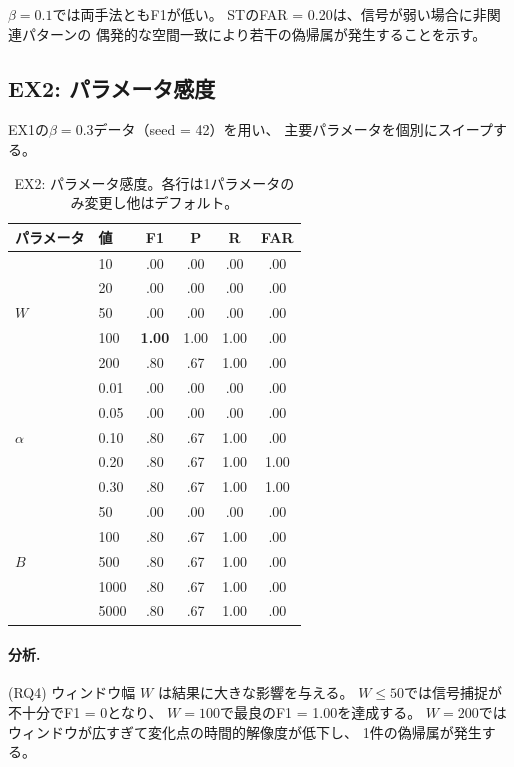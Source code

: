 $\beta = 0.1$では両手法ともF1が低い。
STのFAR = 0.20は、信号が弱い場合に非関連パターンの
偶発的な空間一致により若干の偽帰属が発生することを示す。

\subsection{EX2: パラメータ感度}\label{sec:ex2}

EX1の$\beta = 0.3$データ（seed = 42）を用い、
主要パラメータを個別にスイープする。

\begin{table}[t]
\centering
\caption{EX2: パラメータ感度。各行は1パラメータのみ変更し他はデフォルト。}
\label{tab:ex2}
\small
\begin{tabular}{llcccc}
\toprule
パラメータ & 値 & F1 & P & R & FAR \\
\midrule
\multirow{5}{*}{$W$}
& 10  & .00 & .00 & .00 & .00 \\
& 20  & .00 & .00 & .00 & .00 \\
& 50  & .00 & .00 & .00 & .00 \\
& 100 & \textbf{1.00} & 1.00 & 1.00 & .00 \\
& 200 & .80 & .67 & 1.00 & .00 \\
\midrule
\multirow{5}{*}{$\alpha$}
& 0.01 & .00 & .00 & .00 & .00 \\
& 0.05 & .00 & .00 & .00 & .00 \\
& 0.10 & .80 & .67 & 1.00 & .00 \\
& 0.20 & .80 & .67 & 1.00 & 1.00 \\
& 0.30 & .80 & .67 & 1.00 & 1.00 \\
\midrule
\multirow{5}{*}{$B$}
& 50   & .00 & .00 & .00 & .00 \\
& 100  & .80 & .67 & 1.00 & .00 \\
& 500  & .80 & .67 & 1.00 & .00 \\
& 1000 & .80 & .67 & 1.00 & .00 \\
& 5000 & .80 & .67 & 1.00 & .00 \\
\bottomrule
\end{tabular}
\end{table}

\paragraph{分析.}
(RQ4) ウィンドウ幅 $W$ は結果に大きな影響を与える。
$W \leq 50$では信号捕捉が不十分でF1 = 0となり、
$W = 100$で最良のF1 = 1.00を達成する。
$W = 200$ではウィンドウが広すぎて変化点の時間的解像度が低下し、
1件の偽帰属が発生する。


